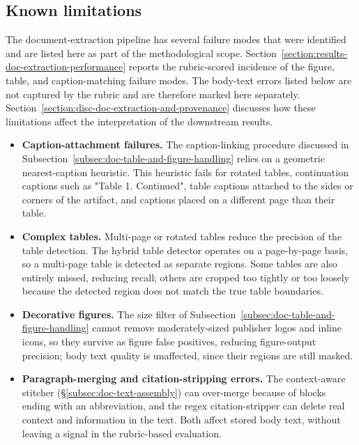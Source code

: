 \subsection{Known limitations}\label{subsec:doc-extraction-known-limitations}

The document-extraction pipeline has several failure modes that were identified and are listed here as part of the methodological scope. Section~\ref{section:results-doc-extraction-performance} reports the rubric-scored incidence of the figure, table, and caption-matching failure modes. The body-text errors listed below are not captured by the rubric and are therefore marked here separately. Section~\ref{section:disc-doc-extraction-and-provenance} discusses how these limitations affect the interpretation of the downstream results. 

\begin{itemize}[label={}, leftmargin=1.5em, itemsep=0.4em]

    \item \textbf{Caption-attachment failures.} The caption-linking procedure discussed in Subsection~\ref{subsec:doc-table-and-figure-handling} relies on a geometric nearest-caption heuristic. This heuristic fails for rotated tables, continuation captions such as "Table 1. Continued", table captions attached to the sides or corners of the artifact, and captions placed on a different page than their table.
    
    \item \textbf{Complex tables.} Multi-page or rotated tables reduce the precision of the table detection. The hybrid table detector operates on a page-by-page basis, so a multi-page table is detected as separate regions. Some tables are also entirely missed, reducing recall; others are cropped too tightly or too loosely because the detected region does not match the true table boundaries.

    \item \textbf{Decorative figures.} The size filter of Subsection~\ref{subsec:doc-table-and-figure-handling} cannot remove moderately-sized publisher logos and inline icons, so they survive as figure false positives, reducing figure-output precision; body text quality is unaffected, since their regions are still masked.
    
    \item \textbf{Paragraph-merging and citation-stripping errors.} The context-aware stitcher (§\ref{subsec:doc-text-assembly}) can over-merge because of blocks ending with an abbreviation, and the regex citation-stripper can delete real context and information in the text. Both affect stored body text, without leaving a signal in the rubric-based evaluation.  
    

\end{itemize}

